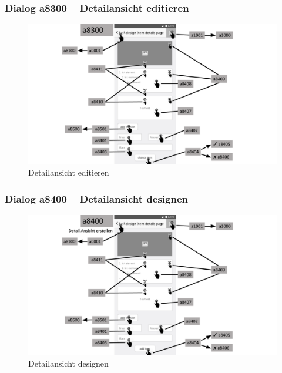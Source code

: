\documentclass[a4paper,12pt,oneside]{scrartcl}
\begin{document}
\subsubsection{Dialog a8300 – Detailansicht editieren}
\begin{figure}[!htbp]
\centering
\noindent\includegraphics[width=\linewidth,height=\textheight,keepaspectratio]{Dialoge/a8300}
\caption{Detailansicht editieren}
\end{figure}
\FloatBarrier

\subsubsection{Dialog a8400 – Detailansicht designen}
\begin{figure}[!htbp]
\centering
\noindent\includegraphics[width=\linewidth,height=\textheight,keepaspectratio]{Dialoge/a8400}
\caption{Detailansicht designen}
\end{figure}
\FloatBarrier
\end{document}
